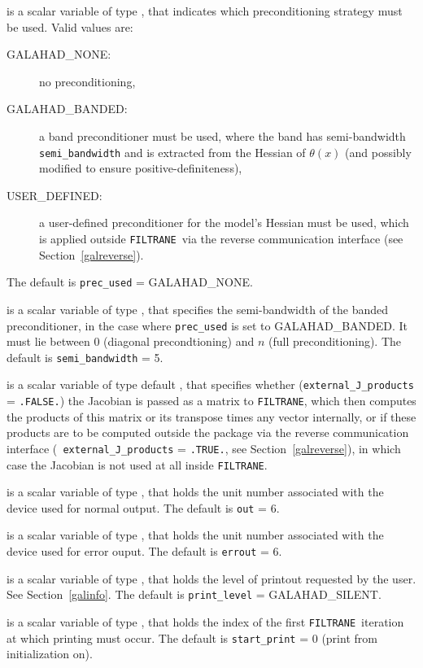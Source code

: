\documentclass{galahad}
\newcommand{\packagename}{FILTRANE}
\newcommand{\sym}{\sf\small}
\newcommand{\filtrane}{{\tt \packagename}}
\begin{document}
\begin{description}
 is a scalar variable of type \integer, that indicates
which preconditioning strategy must be used. Valid values are:
\begin{description}
\item[\sym GALAHAD\_NONE:] no preconditioning,
\item[\sym GALAHAD\_BANDED:] a band preconditioner must be used, where the
band has semi-bandwidth {\tt semi\_bandwidth} and is extracted from
the Hessian of $\theta(x)$ (and possibly modified to ensure
positive-definiteness),
\item[\sym USER\_DEFINED:] a user-defined preconditioner for the model's
Hessian must be used, which is applied outside \filtrane\ via the reverse
communication interface (see Section~\ref{galreverse}).
\end{description}
The default is {\tt prec\_used} = {\sym GALAHAD\_NONE}.

 is a scalar variable of type \integer, that 
specifies the semi-bandwidth of the banded preconditioner, in the case where
{\tt prec\_used} is set to {\sym GALAHAD\_BANDED}. It must lie between
0 (diagonal precondtioning) and $n$ (full preconditioning).
The default is {\tt semi\_bandwidth} = 5.

 is a scalar variable of type default \logical, that 
specifies whether ({\tt external\_J\_products} = {\tt .FALSE.}) the Jacobian
is passed as a matrix to \filtrane, which then computes the products of this
matrix or its transpose times any vector internally, or if these products are
to be computed outside the package via the reverse communication interface ({\tt
external\_J\_products} = {\tt .TRUE.}, see Section~\ref{galreverse}), in which
case the Jacobian is not used at all inside \filtrane.

 is a scalar variable of type \integer, that holds the
unit number associated with the device used for normal output.
The default is {\tt out} = 6.

 is a scalar variable of type \integer, that holds the
unit number associated with the device used for error ouput.
The default is {\tt errout} = 6.

 is a scalar variable of type \integer, that holds the
level of printout requested by the user. See Section~\ref{galinfo}.
The default is {\tt print\_level} = {\sym GALAHAD\_SILENT}.

 is a scalar variable of type \integer, that holds
the index of the first \filtrane\ iteration at which printing must occur.
The default is {\tt start\_print} = 0 (print from initialization on).


\end{description}
\end{document}
